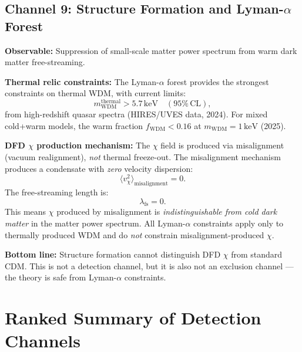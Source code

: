 \documentclass[12pt,a4paper]{article}
\newcommand{\keV}{\,\mathrm{keV}}
\begin{document}
\subsection{Channel 9: Structure Formation and Lyman-$\alpha$ Forest}
\label{sec:structure}

\textbf{Observable:} Suppression of small-scale matter power spectrum
from warm dark matter free-streaming.

\textbf{Thermal relic constraints:} The Lyman-$\alpha$ forest provides
the strongest constraints on thermal WDM, with current limits:
\begin{equation}
m_\mathrm{WDM}^\mathrm{thermal} > 5.7\keV \quad (95\%\,\mathrm{CL}),
\end{equation}
from high-redshift quasar spectra (HIRES/UVES data, 2024). For mixed
cold+warm models, the warm fraction $f_\mathrm{WDM} < 0.16$ at
$m_\mathrm{WDM} = 1\keV$ (2025).

\textbf{DFD $\chi$ production mechanism:} The $\chi$ field is produced
via misalignment (vacuum realignment), \emph{not} thermal freeze-out.
The misalignment mechanism produces a condensate with \emph{zero}
velocity dispersion:
\begin{equation}
\langle v_\chi^2 \rangle_\mathrm{misalignment} = 0.
\end{equation}
The free-streaming length is:
\begin{equation}
\lambda_\mathrm{fs} = 0.
\end{equation}
This means $\chi$ produced by misalignment is \emph{indistinguishable
from cold dark matter} in the matter power spectrum. All Lyman-$\alpha$
constraints apply only to thermally produced WDM and do \emph{not}
constrain misalignment-produced $\chi$.

\textbf{Bottom line:} Structure formation cannot distinguish DFD $\chi$
from standard CDM. This is not a detection channel, but it is also
not an exclusion channel --- the theory is safe from Lyman-$\alpha$
constraints.

\begin{center}
\end{center}

\section{Ranked Summary of Detection Channels}
\end{document}
